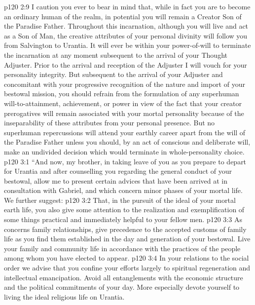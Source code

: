 \vs p120 2:9 \bibnobreakspace I caution you ever to bear in mind that, while in fact you are to become an ordinary human of the realm, in potential you will remain a Creator Son of the Paradise Father. Throughout this incarnation, although you will live and act as a Son of Man, the creative attributes of your personal divinity will follow you from Salvington to Urantia. It will ever be within your power\hyp{}of\hyp{}will to terminate the incarnation at any moment subsequent to the arrival of your Thought Adjuster. Prior to the arrival and reception of the Adjuster I will vouch for your personality integrity. But subsequent to the arrival of your Adjuster and concomitant with your progressive recognition of the nature and import of your bestowal mission, you should refrain from the formulation of any superhuman will\hyp{}to\hyp{}attainment, achievement, or power in view of the fact that your creator prerogatives will remain associated with your mortal personality because of the inseparability of these attributes from your personal presence. But no superhuman repercussions will attend your earthly career apart from the will of the Paradise Father unless you should, by an act of conscious and deliberate will, make an undivided decision which would terminate in whole\hyp{}personality choice.
\vs p120 3:1 “And now, my brother, in taking leave of you as you prepare to depart for Urantia and after counselling you regarding the general conduct of your bestowal, allow me to present certain advices that have been arrived at in consultation with Gabriel, and which concern minor phases of your mortal life. We further suggest:
\vs p120 3:2 \bibnobreakspace That, in the pursuit of the ideal of your mortal earth life, you also give some attention to the realization and exemplification of some things practical and immediately helpful to your fellow men.
\vs p120 3:3 \bibnobreakspace As concerns family relationships, give precedence to the accepted customs of family life as you find them established in the day and generation of your bestowal. Live your family and community life in accordance with the practices of the people among whom you have elected to appear.
\vs p120 3:4 \bibnobreakspace In your relations to the social order we advise that you confine your efforts largely to spiritual regeneration and intellectual emancipation. Avoid all entanglements with the economic structure and the political commitments of your day. More especially devote yourself to living the ideal religious life on Urantia.
